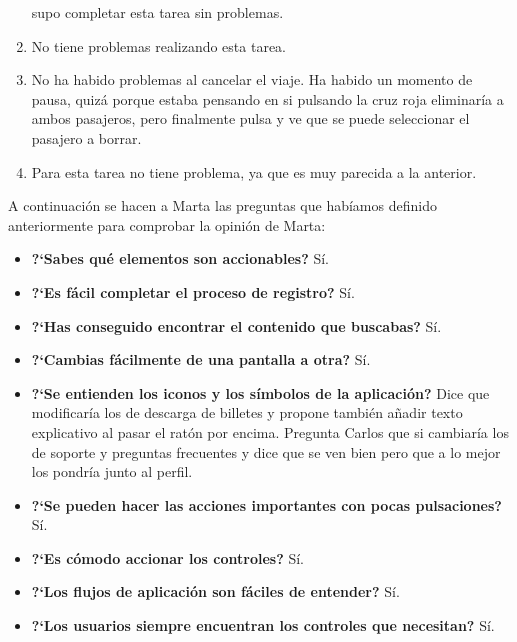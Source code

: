 \begin{enumerate}
        supo completar esta tarea sin problemas.
    \item No tiene problemas realizando esta tarea.
    \item No ha habido problemas al cancelar el viaje. Ha habido un momento de pausa, quizá porque estaba pensando en si pulsando la cruz roja eliminaría
        a ambos pasajeros, pero finalmente pulsa y ve que se puede seleccionar el pasajero a borrar.
    \item Para esta tarea no tiene problema, ya que es muy parecida a la anterior.
\end{enumerate}

A continuación se hacen a Marta las preguntas que habíamos definido anteriormente para comprobar la opinión de Marta:

\begin{itemize}
    \item \textbf{?`Sabes qué elementos son accionables?} Sí. 
    \item \textbf{?`Es fácil completar el proceso de registro?} Sí. 
    \item \textbf{?`Has conseguido encontrar el contenido que buscabas?} Sí.
    \item \textbf{?`Cambias fácilmente de una pantalla a otra?} Sí.
    \item \textbf{?`Se entienden los iconos y los símbolos de la aplicación?} Dice que modificaría los de descarga de billetes y propone
        también añadir texto explicativo al pasar el ratón por encima. Pregunta Carlos que si cambiaría los de soporte y preguntas frecuentes
        y dice que se ven bien pero que a lo mejor los pondría junto al perfil.
    \item \textbf{?`Se pueden hacer las acciones importantes con pocas pulsaciones?} Sí.
    \item \textbf{?`Es cómodo accionar los controles?} Sí.
    \item \textbf{?`Los flujos de aplicación son fáciles de entender?} Sí.
    \item \textbf{?`Los usuarios siempre encuentran los controles que necesitan?} Sí.
\end{itemize}
